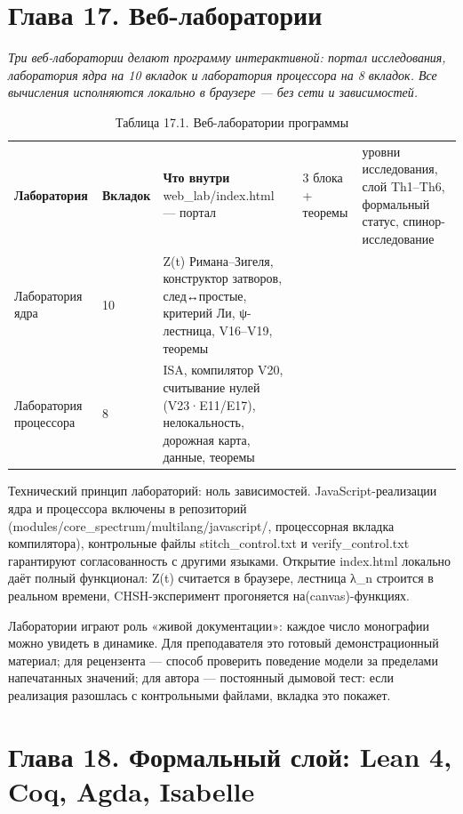 \documentclass[11pt,a4paper]{article}
\begin{document}
\section{Глава 17. Веб-лаборатории}

\noindent\textit{\color{copper}Три веб-лаборатории делают программу интерактивной: портал исследования, лаборатория ядра на 10 вкладок и лаборатория процессора на 8 вкладок. Все вычисления исполняются локально в браузере — без сети и зависимостей.}

\begin{table}[htbp]\centering\small
\caption{Таблица 17.1. Веб-лаборатории программы}
\begin{tabular}{p{} p{} p{}}
\toprule
\textbf{Лаборатория} & \textbf{Вкладок} & \textbf{Что внутри}
\midrule
web\_lab/index.html — портал & 3 блока + теоремы & уровни исследования, слой Th1–Th6, формальный статус, спинор-исследование \\
Лаборатория ядра & 10 & Z(t) Римана–Зигеля, конструктор затворов, след↔простые, критерий Ли, ψ-лестница, V16–V19, теоремы \\
Лаборатория процессора & 8 & ISA, компилятор V20, считывание нулей (V23·E11/E17), нелокальность, дорожная карта, данные, теоремы \\
\bottomrule
\end{tabular}
\end{table}

Технический принцип лабораторий: ноль зависимостей. JavaScript-реализации ядра и процессора включены в репозиторий (modules/core\_spectrum/multilang/javascript/, процессорная вкладка компилятора), контрольные файлы stitch\_control.txt и verify\_control.txt гарантируют согласованность с другими языками. Открытие index.html локально даёт полный функционал: Z(t) считается в браузере, лестница λ\_n строится в реальном времени, CHSH-эксперимент прогоняется на(canvas)-функциях.

Лаборатории играют роль «живой документации»: каждое число монографии можно увидеть в динамике. Для преподавателя это готовый демонстрационный материал; для рецензента — способ проверить поведение модели за пределами напечатанных значений; для автора — постоянный дымовой тест: если реализация разошлась с контрольными файлами, вкладка это покажет.

\section{Глава 18. Формальный слой: Lean 4, Coq, Agda, Isabelle}
\end{document}
